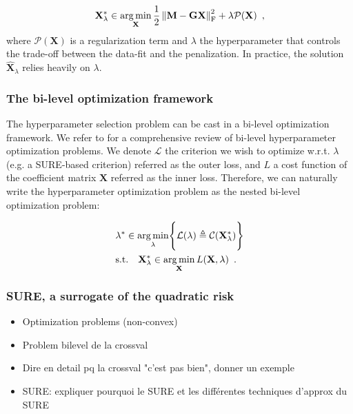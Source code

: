 \begin{equation}
    \mathbf{X}_{\lambda}^* \in \operatorname*{arg\,min}_{\mathbf{X}}
    \frac{1}{2}\left \lVert \mathbf{M - GX} \right \rVert^2_{\text{F}}
    + \lambda \mathcal{P}(\mathbf{X})
    \enspace ,
\end{equation}
%
where $\mathcal{P}(\mathbf{X})$ is a regularization term and $\lambda$ the hyperparameter
that controls the trade-off between the data-fit and the penalization. In practice, the solution
$\hat{\mathbf{X}}_{\lambda}$ relies heavily on $\lambda$.

\subsubsection{The bi-level optimization framework}

The hyperparameter selection problem can be cast in a bi-level optimization framework. We refer 
to \cite{Pedregosa16} for a comprehensive review of bi-level hyperparameter optimization problems.
We denote $\mathcal{L}$ the criterion we wish to optimize w.r.t. $\lambda$ (e.g. a SURE-based criterion) 
referred as the outer loss, and $L$ a cost function of the coefficient matrix $\mathbf{X}$ referred
as the inner loss. Therefore, we can naturally write the hyperparameter optimization problem as the 
nested bi-level optimization problem:

\begin{align*}
    &\lambda^* \in \operatorname*{arg\,min}_{\lambda} 
    \Biggl\{
        \mathcal{L}(\lambda) 
        \triangleq 
        \mathcal{C}(\mathbf{X}_{\lambda}^*)
    \Biggr\} \\
    &\text{s.t.} \quad 
    \mathbf{X}_{\lambda}^* 
    \in 
    \operatorname*{arg\,min}_{\mathbf{X}} L(\mathbf{X}, \lambda)
    \enspace .
\end{align*}
%


\subsubsection{SURE, a surrogate of the quadratic risk}

\begin{itemize}
    \item Optimization problems (non-convex)
    \item Problem bilevel de la crossval
    \item Dire en detail pq la crossval "c'est pas bien", donner un exemple
    \item SURE: expliquer pourquoi le SURE et les différentes techniques d'approx du SURE
\end{itemize}
%
%
%
%
